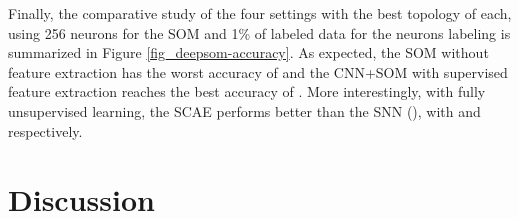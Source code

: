 \documentclass[runningheads]{llncs}
\begin{document}
Finally, the comparative study of the four settings with the best topology of each, using 256 neurons for the SOM and 1\% of labeled data for the neurons labeling is summarized in Figure \ref{fig_deepsom-accuracy}. As expected, the SOM without feature extraction has the worst accuracy of  and the CNN+SOM with supervised feature extraction reaches the best accuracy of . More interestingly, with fully unsupervised learning, the SCAE performs better than the SNN (), with  and  respectively.



\section{Discussion}
\label{sec_discussion}

\begin{table}[ht]
\centering
\caption{Comparison of unsupervised feature extraction and classification techniques in terms of accuracy and hardware cost.}
\label{tab_cost}
\begin{center}
\end{center}
\end{table}
\end{document}
